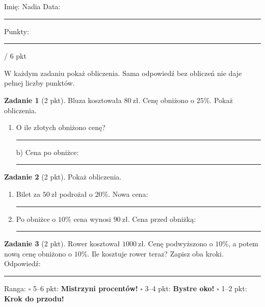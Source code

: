 \documentclass[11pt,a4paper]{article}
\begin{document}

\vspace{0.2em}
Imię: Nadia \hfill Data: \rule{3cm}{0.4pt} \hfill Punkty: \rule{1.2cm}{0.4pt} / 6 pkt

{\small W każdym zadaniu pokaż obliczenia. Sama odpowiedź bez obliczeń nie daje pełnej liczby punktów.}

\vspace{0.4em}

\textbf{Zadanie 1} (2 pkt). Bluza kosztowała $80\ \text{zł}$. Cenę obniżono o $25\%$. Pokaż obliczenia.
\begin{enumerate}[label=\alph*), leftmargin=*, itemsep=2pt]
  \item O ile złotych obniżono cenę? \rule{2.5cm}{0.4pt} \hspace{0.5cm} b) Cena po obniżce: \rule{2.5cm}{0.4pt}
\end{enumerate}
\miejsce{4cm}

\textbf{Zadanie 2} (2 pkt). Pokaż obliczenia.
\begin{enumerate}[label=\alph*), leftmargin=*, itemsep=2pt]
  \item Bilet za $50\ \text{zł}$ podrożał o $20\%$. Nowa cena: \rule{2.5cm}{0.4pt}
  \item Po obniżce o $10\%$ cena wynosi $90\ \text{zł}$. Cena przed obniżką: \rule{2.5cm}{0.4pt}
\end{enumerate}
\miejsce{4.5cm}

\textbf{Zadanie 3} (2 pkt). Rower kosztował $1000\ \text{zł}$. Cenę podwyższono o $10\%$, a potem nową cenę obniżono o $10\%$. Ile kosztuje rower teraz? Zapisz oba kroki.
\miejsce{5cm}
Odpowiedź: \rule{4cm}{0.4pt}

\vfill
\begin{tcolorbox}[colback=white, colframe=cel, boxrule=0.6pt, arc=2pt]
Ranga: \quad $\square$ 5--6 pkt: \textbf{Mistrzyni procentów!} \quad $\square$ 3--4 pkt: \textbf{Bystre oko!} \quad $\square$ 1--2 pkt: \textbf{Krok do przodu!}
\end{tcolorbox}
\end{document}
